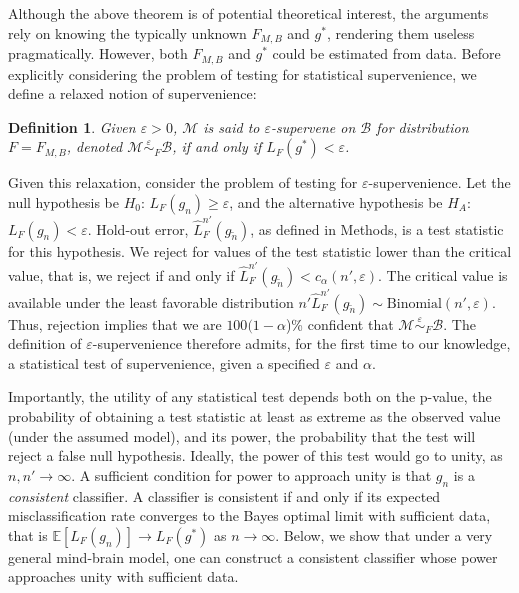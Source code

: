 \documentclass{article}
\newcommand{\conv}{\rightarrow}
\newcommand{\mB}{\mathcal{B}}
\newcommand{\mM}{\mathcal{M}}
\newcommand{\EE}{\mathbb{E}}           %
\newcommand{\eps}{\varepsilon}
\providecommand{\mt}[1]{\widetilde{#1}}
\newcommand{\hL}{\widehat{L}}
\newcommand{\MeB}{\mM \overset{\varepsilon}{{\sim}}_{F} \mB}
\newtheorem{defi}{Definition}
\begin{document}
Although the above theorem is of potential theoretical interest, the arguments rely on knowing the typically unknown $F_{M,B}$ and $g^*$, rendering them useless pragmatically.  However, both $F_{M,B}$ and $g^*$ could be estimated from data.  
Before explicitly considering the problem of testing for statistical supervenience, we define a relaxed notion of supervenience:
\begin{defi}
\label{def2}
Given $\varepsilon > 0$, $\mM$ is said to $\varepsilon$-\textit{supervene} on $\mB$ for distribution $F=F_{M,B}$, denoted $\MeB$, if and only if $L_{F}(g^*) < \varepsilon$.
\end{defi}
\noindent Given this relaxation, consider the problem of testing for $\eps$-supervenience. Let the null hypothesis be $H_0$: $L_{F}(g_n) \geq \eps$, and the alternative hypothesis be $H_A$: $L_{F}(g_n) < \eps$. Hold-out error, $\hL^{n'}_{F}(g_{\mt{n}})$, as defined in Methods, is a test statistic for this hypothesis.  We reject for values of the test statistic lower than the critical value, that is, we reject if and only if $\hL^{n'}_{F}(g_{\mt{n}}) <c_{\alpha}(n',\varepsilon)$.  The critical value is available under the least favorable distribution $n' \hL^{n'}_{F}(g_{\mt{n}}) \sim \text{Binomial}(n',\varepsilon)$.  Thus, rejection implies that we are $100(1-\alpha$)\% confident that $\MeB$.  The definition of $\eps$-supervenience therefore admits, for the first time to our knowledge, a statistical test of supervenience, given a specified $\eps$ and $\alpha$. 

	
	
Importantly, the utility of any statistical test depends both on the p-value, the probability of obtaining a test statistic at least as extreme as the observed value (under the assumed model), and its power, the probability that the test will reject a false null hypothesis.  Ideally, the power of this test would go to unity, as $n,n' \rightarrow \infty$.  A sufficient condition for power to approach unity is that $g_n$ is a \emph{consistent} classifier.  A classifier is consistent if and only if its expected misclassification rate converges to the Bayes optimal limit with sufficient data, that is $\EE[L_{F}(g_n)] \conv L_{F}(g^*)$ as $n\conv \infty$.  Below, we show that under a very general mind-brain model, one can construct a consistent classifier whose power approaches unity with sufficient data.
\end{document}
